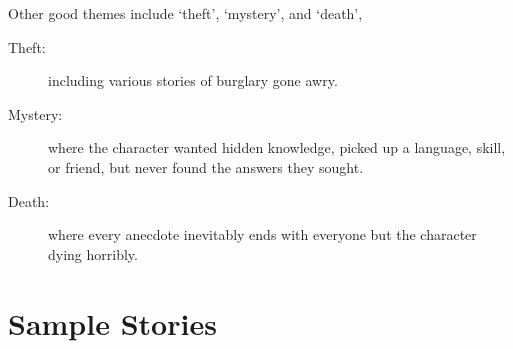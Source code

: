 \begin{multicols}{2}
Other good themes include `theft', `mystery', and `death', 

\begin{description}
  \item[Theft:]
  including various stories of burglary gone awry.
  \item[Mystery:]
  where the character wanted hidden knowledge, picked up a language, skill, or friend, but never found the answers they sought.
  \item[Death:]
  where every anecdote inevitably ends with everyone but the character dying horribly.
\end{description}

\end{multicols}

\section{Sample Stories}

